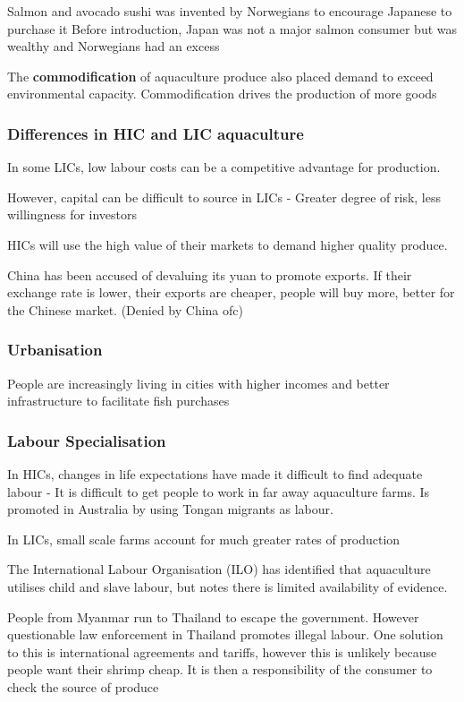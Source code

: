 				Salmon and avocado sushi was invented by Norwegians to encourage Japanese to purchase it
				Before introduction, Japan was not a major salmon consumer but was wealthy and Norwegians had an excess

				The \textbf{commodification} of aquaculture produce also placed demand to exceed environmental capacity. Commodification drives the production of more goods

			\subsubsection{Differences in HIC and LIC aquaculture}
				In some LICs, low labour costs can be a competitive advantage for production. 

				However, capital can be difficult to source in LICs - Greater degree of risk, less willingness for investors

				HICs will use the high value of their markets to demand higher quality produce.

				China has been accused of devaluing its yuan to promote exports. If their exchange rate is lower, their exports are cheaper, people will buy more, better for the Chinese market. (Denied by China ofc)
			
			\subsubsection{Urbanisation}
				People are increasingly living in cities with higher incomes and better infrastructure to facilitate fish purchases

			\subsubsection{Labour Specialisation}
				In HICs, changes in life expectations have made it difficult to find adequate labour - It is difficult to get people to work in far away aquaculture farms. Is promoted in Australia by using Tongan migrants as labour.

				In LICs, small scale farms account for much greater rates of production

				The International Labour Organisation (ILO) has identified that aquaculture utilises child and slave labour, but notes there is limited availability of evidence.

				People from Myanmar run to Thailand to escape the government. However questionable law enforcement in Thailand promotes illegal labour.
				One solution to this is international agreements and tariffs, however this is unlikely because people want their shrimp cheap. It is then a responsibility of the consumer to check the source of produce

